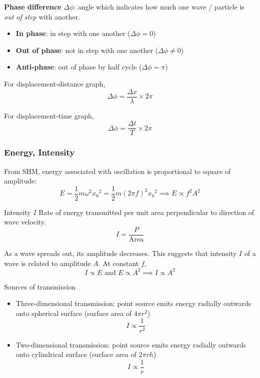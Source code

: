 \textbf{Phase difference} $\Delta\phi$: angle which indicates how much one wave / particle is \emph{out of step} with another.
\begin{itemize}
\item \textbf{In phase}: in step with one another ($\Delta\phi=0$)
\item \textbf{Out of phase}: not in step with one another ($\Delta\phi\neq0$)
\item \textbf{Anti-phase}: out of phase by half cycle ($\Delta\phi=\pi$)
\end{itemize}

For displacement-distance graph,
\begin{equation}
\Delta\phi = \frac{\Delta x}{\lambda} \times 2\pi
\end{equation}

For displacement-time graph,
\begin{equation}
\Delta\phi = \frac{\Delta t}{T} \times 2\pi
\end{equation}

\subsubsection{Energy, Intensity}
From SHM, energy associated with oscillation is proportional to square of amplitude:
\[ E = \frac{1}{2}m\omega^2{x_0}^2 = \frac{1}{2}m(2\pi f)^2{x_0}^2 \implies \boxed{E\propto f^2A^2} \]

\begin{defn}{Intensity $I$}{}
Rate of energy transmitted per unit area perpendicular to direction of wave velocity.
\begin{equation}
I = \frac{P}{\text{Area}}
\end{equation}
\end{defn}

As a wave spreads out, its amplitude decreases. This suggests that intensity $I$ of a wave is related to amplitude $A$. At constant $f$,
\[ I\propto E \text{ and } E\propto A^2 \implies \boxed{I\propto A^2} \]

Sources of transmission
\begin{itemize}
\item Three-dimensional transmission: point source emits energy radially outwards onto spherical surface (surface area of $4\pi r^2$)
\[ I\propto\frac{1}{r^2} \]
\item Two-dimensional transmission: point source emits energy radially outwards onto cylindrical surface (surface area of $2\pi rh$)
\[ I\propto\frac{1}{r} \]
\end{itemize}
\pagebreak

